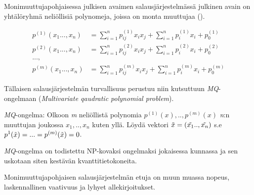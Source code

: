Monimuuttujapohjaisessa julkisen avaimen salausjärjestelmässä julkinen avain on yhtälöryhmä neliöllisiä polynomeja, joissa on monta muuttujaa (\cite{8012305}).

    \begin{align*}
        p^{(1)}(x_{1}...,x_{n}) &= \sum_{i=1}^{n} p_{ij}^{(1)}x_{i}x_ {j}+\sum_{i=1}^{n}p_ {i}^{(1)}x_{i}+p_ {0}^{(1)} \\
        p^{(2)}(x_{1}...,x_{n}) &= \sum_{i=1}^{n} p_{ij}^{(2)}x_{i}x_ {j}+\sum_{i=1}^{n}p_ {i}^{(2)}x_{i}+p_ {0}^{(2)} \\
        ..., \\
        p^{(m)}(x_{1}...,x_{n}) &= \sum_{i=1}^{n} p_{ij}^{(m)}x_{i}x_ {j}+\sum_{i=1}^{n}p_ {i}^{(m)}x_{i}+p_ {0}^{(m)}
    \end{align*}
    
Tällaisen salausjärjestelmän turvallisuus perustuu niin kutsuttuun \emph{MQ}-ongelmaan (\emph{Multivariate qaudratic polynomial problem}).

\emph{MQ}-ongelma: Olkoon \emph{m} neliöllistä polynomia $p^{(1)}(x), .., p^{(m)}(x)$ \emph{n}:n muuttujan joukossa $x_{1}, .., x_{n}$ kuten yllä. Löydä vektori $\Tilde{x}=(\Tilde{x_{1}} .., \Tilde{x_{n}})$ s.e $p^{1}(\Tilde{x})=...=p^{(m)}(\Tilde{x})=0$.

\emph{MQ}-ongelma on todistettu NP-kovaksi ongelmaksi jokaisessa kunnassa ja sen uskotaan siten kestävän kvanttitietokoneita.

Monimuuttujapohjaisen salausjärjestelmän etuja on muun muassa nopeus, laskennallinen vaativuus ja lyhyet allekirjoitukset.